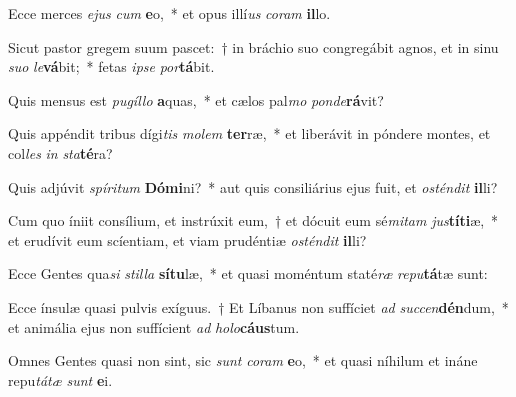 \item Ecce merces \textit{e}\textit{jus} \textit{cum} \textbf{e}o,~* et opus illí\textit{us} \textit{co}\textit{ram} \textbf{il}lo.
\item Sicut pastor gregem suum pascet:~† in bráchio suo congregábit agnos, et in sinu \textit{su}\textit{o} \textit{le}\textbf{vá}bit;~* fetas \textit{ip}\textit{se} \textit{por}\textbf{tá}bit.
\item Quis mensus est \textit{pu}\textit{gíl}\textit{lo} \textbf{a}quas,~* et cælos pal\textit{mo} \textit{pon}\textit{de}\textbf{rá}vit?
\item Quis appéndit tribus dígi\textit{tis} \textit{mo}\textit{lem} \textbf{ter}ræ,~* et liberávit in póndere montes, et col\textit{les} \textit{in} \textit{sta}\textbf{té}ra?
\item Quis adjúvit \textit{spí}\textit{ri}\textit{tum} \textbf{Dó}\textbf{mi}ni?~* aut quis consiliárius ejus fuit, et \textit{os}\textit{tén}\textit{dit} \textbf{il}li?
\item Cum quo íniit consílium, et instrúxit eum,~† et dócuit eum sé\textit{mi}\textit{tam} \textit{jus}\textbf{tí}\textbf{ti}æ,~* et erudívit eum scíentiam, et viam prudéntiæ \textit{os}\textit{tén}\textit{dit} \textbf{il}li?
\item Ecce Gentes qua\textit{si} \textit{stil}\textit{la} \textbf{sí}\textbf{tu}læ,~* et quasi moméntum staté\textit{ræ} \textit{re}\textit{pu}\textbf{tá}tæ sunt:
\item Ecce ínsulæ quasi pulvis exíguus.~† Et Líbanus non suffíciet \textit{ad} \textit{suc}\textit{cen}\textbf{dén}dum,~* et animália ejus non suffícient \textit{ad} \textit{ho}\textit{lo}\textbf{cáus}tum.
\item Omnes Gentes quasi non sint, sic \textit{sunt} \textit{co}\textit{ram} \textbf{e}o,~* et quasi níhilum et ináne repu\textit{tá}\textit{tæ} \textit{sunt} \textbf{e}i.
